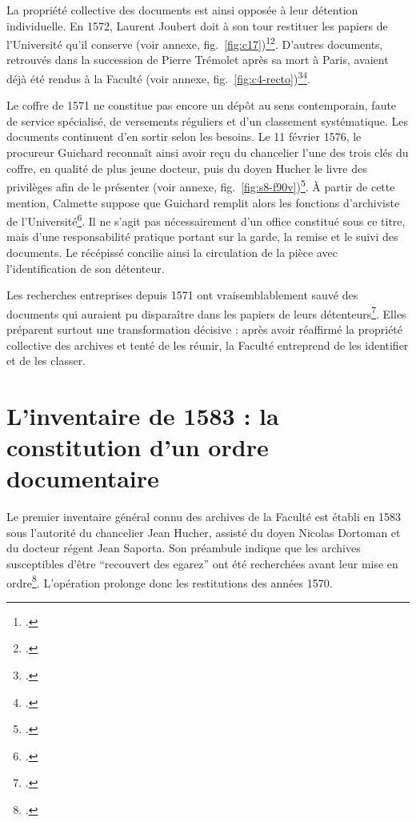 La propriété collective des documents est ainsi opposée à leur détention individuelle. En 1572, Laurent Joubert doit à son tour restituer les papiers de l'Université qu'il conserve (voir annexe, fig.~\ref{fig:c17})\footcite{AHFMC17}\footcite[p.~XI--XII]{CalmetteCartulaire1912}. D'autres documents, retrouvés dans la succession de Pierre Trémolet après sa mort à Paris, avaient déjà été rendus à la Faculté (voir annexe, fig.~\ref{fig:c4-recto})\footcite{AHFMC4}\footcite[p.~XII, vue~31 de la version numérisée]{CalmetteCartulaire1912}.

Le coffre de 1571 ne constitue pas encore un dépôt au sens contemporain, faute de service spécialisé, de versements réguliers et d'un classement systématique. Les documents continuent d'en sortir selon les besoins. Le 11 février 1576, le procureur Guichard reconnaît ainsi avoir reçu du chancelier l'une des trois clés du coffre, en qualité de plus jeune docteur, puis du doyen Hucher le livre des privilèges afin de le présenter (voir annexe, fig.~\ref{fig:s8-f90v})\footcite[fol.~90~v°]{AHFMS8}. À partir de cette mention, Calmette suppose que Guichard remplit alors les fonctions d'archiviste de l'Université\footcite[p.~XI, vue ~30 de la version numérisée]{CalmetteCartulaire1912}. Il ne s'agit pas nécessairement d'un office constitué sous ce titre, mais d'une responsabilité pratique portant sur la garde, la remise et le suivi des documents. Le récépissé concilie ainsi la circulation de la pièce avec l'identification de son détenteur.

Les recherches entreprises depuis 1571 ont vraisemblablement sauvé des documents qui auraient pu disparaître dans les papiers de leurs détenteurs\footcite[p.~XI--XIII, vues~30 à 32 de la version numérisée]{CalmetteCartulaire1912}. Elles préparent surtout une transformation décisive : après avoir réaffirmé la propriété collective des archives et tenté de les réunir, la Faculté entreprend de les identifier et de les classer.

\section{L'inventaire de 1583 : la constitution d'un ordre documentaire}

Le premier inventaire général connu des archives de la Faculté est établi en 1583 sous l'autorité du chancelier Jean Hucher, assisté du doyen Nicolas Dortoman et du docteur régent Jean Saporta. Son préambule indique que les archives susceptibles d'être \enquote{recouvert des egarez} ont été recherchées avant leur mise en ordre\footcite[p.~XII, vue~31 de la version numérisée]{CalmetteCartulaire1912}. L'opération prolonge donc les restitutions des années 1570.

